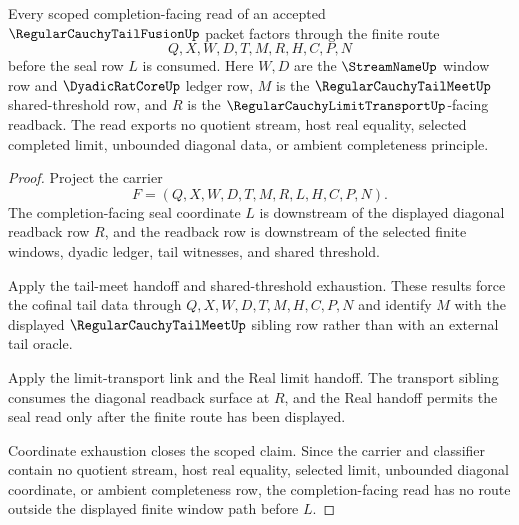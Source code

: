 \begin{theorem}
\label{thm:regular-cauchy-tail-fusion-scoped-window-exhaustion}
Every scoped completion-facing read of an accepted $\RegularCauchyTailFusionUp$ packet factors through the finite route
$$
Q,X,W,D,T,M,R,H,C,P,N
$$
before the seal row $L$ is consumed. Here $W,D$ are the $\StreamNameUp$ window row and $\DyadicRatCoreUp$ ledger row, $M$ is the $\RegularCauchyTailMeetUp$ shared-threshold row, and $R$ is the $\RegularCauchyLimitTransportUp$-facing readback. The read exports no quotient stream, host real equality, selected completed limit, unbounded diagonal data, or ambient completeness principle.
\end{theorem}
\begin{proof}
Project the carrier
$$
F=(Q,X,W,D,T,M,R,L,H,C,P,N).
$$
The completion-facing seal coordinate $L$ is downstream of the displayed diagonal readback row $R$, and the readback row is downstream of the selected finite windows, dyadic ledger, tail witnesses, and shared threshold.

Apply the tail-meet handoff and shared-threshold exhaustion. These results force the cofinal tail data through $Q,X,W,D,T,M,H,C,P,N$ and identify $M$ with the displayed $\RegularCauchyTailMeetUp$ sibling row rather than with an external tail oracle.

Apply the limit-transport link and the Real limit handoff. The transport sibling consumes the diagonal readback surface at $R$, and the Real handoff permits the seal read only after the finite route has been displayed.

Coordinate exhaustion closes the scoped claim. Since the carrier and classifier contain no quotient stream, host real equality, selected limit, unbounded diagonal coordinate, or ambient completeness row, the completion-facing read has no route outside the displayed finite window path before $L$.
\end{proof}

